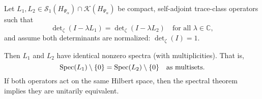 \begin{lemma}
\label{lem:spectral_rigidity_determinant}
Let \( L_1, L_2 \in \mathcal{S}_1(H_{\Psi_\alpha}) \cap \mathcal{K}(H_{\Psi_\alpha}) \) be compact, self-adjoint trace-class operators such that
\[
\det\nolimits_\zeta(I - \lambda L_1) = \det\nolimits_\zeta(I - \lambda L_2)
\quad \text{for all } \lambda \in \mathbb{C},
\]
and assume both determinants are normalized: \( \det_\zeta(I) = 1 \).

Then \( L_1 \) and \( L_2 \) have identical nonzero spectra (with multiplicities). That is,
\[
\operatorname{Spec}(L_1) \setminus \{0\} = \operatorname{Spec}(L_2) \setminus \{0\}
\quad \text{as multisets}.
\]
If both operators act on the same Hilbert space, then the spectral theorem implies they are unitarily equivalent.
\end{lemma}
% 
